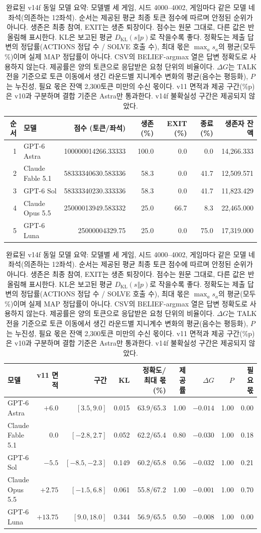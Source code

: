 \begin{table}[t]
\centering\scriptsize
\setlength{\tabcolsep}{4pt}
\caption{완료된 v14f 동일 모델 요약: 모델별 세 게임, 시드 4000--4002, 게임마다 같은 모델 네 좌석(의존하는 12좌석). 순서는 제공된 평균 최종 토큰 점수에 따르며 안정된 순위가 아니다. 생존은 최종 참여, EXIT는 생존 퇴장이다. 점수는 원문 그대로, 다른 값은 반올림해 표시한다. KL은 보고된 평균 $D_{\mathrm{KL}}(s\Vert p)$로 작을수록 좋다. 정확도는 제출 답변의 정답률(ACTIONS 정답 수 / SOLVE 호출 수), 최대 몫은 $\max_a s_a$의 평균(모두 \%)이며 실제 MAP 정답률이 아니다. CSV의 BELIEF-argmax 열은 답변 정확도로 사용하지 않는다. 제공률은 양의 토큰으로 응답받은 요청 단위의 비율이다. $\Delta G$는 TALK 전을 기준으로 토큰 이동에서 생긴 라운드별 지니계수 변화의 평균(음수는 평등화), $P$는 누진성, 필요 몫은 잔액 2,300토큰 미만의 수신 몫이다. v11 면적과 제공 구간(\%p)은 v10과 구분하며 결합 기준은 Astra만 통과한다. v14f 불확실성 구간은 제공되지 않았다.}
\label{tab:v14f-models}
\begin{tabular}{@{}rlrrrrr@{}}
\toprule
순서 & 모델 & 점수 (토큰/좌석) & 생존 (\%) & EXIT (\%) & 종료 (\%) & 생존자 잔액 \\
\midrule
1 & GPT-6 Astra & 100000014266.33333 & 100.0 & 0.0 & 0.0 & 14,266.333 \\
2 & Claude Fable 5.1 & 58333340630.583336 & 58.3 & 0.0 & 41.7 & 12,509.571 \\
3 & GPT-6 Sol & 58333340230.333336 & 58.3 & 0.0 & 41.7 & 11,823.429 \\
4 & Claude Opus 5.5 & 25000013949.583332 & 25.0 & 66.7 & 8.3 & 22,465.000 \\
5 & GPT-6 Luna & 25000004329.75 & 25.0 & 0.0 & 75.0 & 17,319.000 \\
\bottomrule
\end{tabular}
\par\vspace{5pt}
\begin{tabular}{@{}lrrrrrrrr@{}}
\toprule
모델 & v11 면적 & 구간 & KL & 정확도/최대 몫 (\%) & 제공률 & $\Delta G$ & $P$ & 필요 몫 \\
\midrule
GPT-6 Astra & $+6.0$ & $[3.5,9.0]$ & 0.015 & 63.9/65.3 & 1.00 & $-0.014$ & 1.00 & 0.00 \\
Claude Fable 5.1 & $0.0$ & $[-2.8,2.7]$ & 0.052 & 62.2/65.4 & 0.80 & $-0.030$ & 1.00 & 0.18 \\
GPT-6 Sol & $-5.5$ & $[-8.5,-2.3]$ & 0.149 & 60.2/65.8 & 0.56 & $-0.032$ & 1.00 & 0.21 \\
Claude Opus 5.5 & $+2.75$ & $[-1.5,6.8]$ & 0.061 & 55.8/67.2 & 1.00 & $-0.001$ & 1.00 & 0.70 \\
GPT-6 Luna & $+13.75$ & $[9.0,18.0]$ & 0.344 & 56.9/65.5 & 0.50 & $-0.008$ & 1.00 & 0.00 \\
\bottomrule
\end{tabular}
\end{table}
